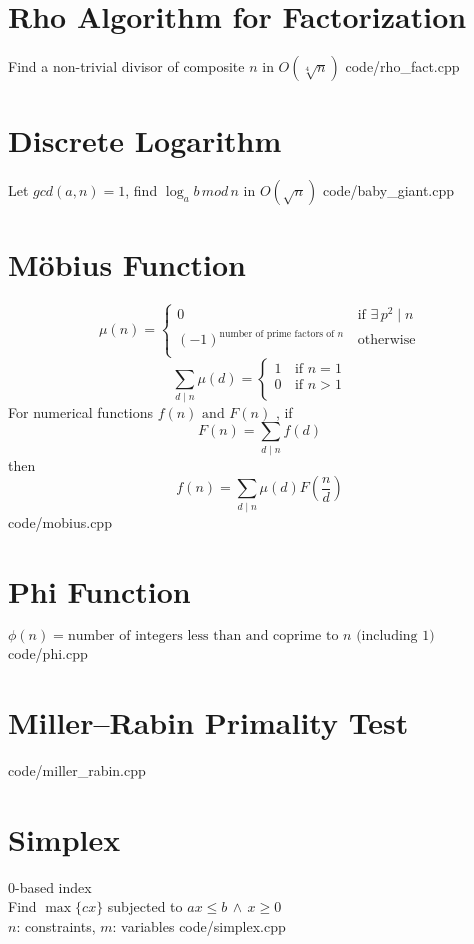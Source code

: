 \documentclass [landscape,8pt,a4paper,twocolumn]{article}
\begin{document}
\section{Rho Algorithm for Factorization}
Find a non-trivial divisor of composite $ n $ in $ O(\sqrt[4]{n}) $
 {code/rho_fact.cpp}

\section{Discrete Logarithm}
Let $ gcd(a, n)=1 $, find $ \log_{a}{b} \, mod \, n $ in $ O(\sqrt{n}) $
 {code/baby_giant.cpp}

\section{Möbius Function}
\[\mu (n) =
 	\begin{cases}
		0	& \, \text{if } \exists \, p^2 \mid n \\
		(-1)^{\text{number of prime factors of } n}	& \, \text{otherwise} \\
	\end{cases}
\]
\[\sum_{d \mid n} \mu(d) =
	\begin{cases}
    	1	& \, \text{if } n=1 \\
        0	& \, \text{if } n>1 \\
	\end{cases}
\]
For numerical functions $ f(n) \text{ and } F(n) $ , if
\[
	F(n)=\sum_{d \mid n}f(d)
\]
then
\[
	f(n)=\sum_{d \mid n}\mu(d)F(\frac{n}{d})
\]
 {code/mobius.cpp}

\section{Phi Function}
$ \phi(n)= \text{number of integers less than and coprime to } n \text{ (including } 1) $
 {code/phi.cpp}

\section{Miller–Rabin Primality Test}
 {code/miller_rabin.cpp}

\vfill\null

\section{Simplex}
0-based index \\
Find $ \max\{cx\} $ subjected to $ ax \leq b \, \wedge \, x \geq 0 $ \\
$ n $: constraints, $ m $: variables
 {code/simplex.cpp}
\end{document}
